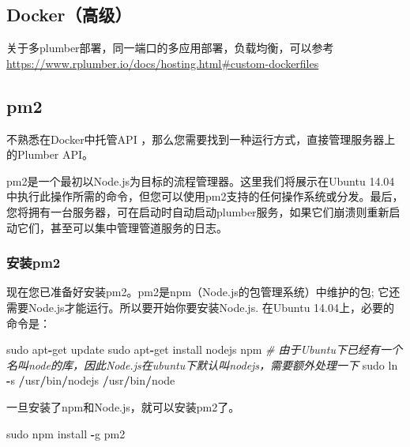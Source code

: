 \documentclass[]{book}
\newenvironment{Shaded}{\begin{snugshade}}{\end{snugshade}}
\newcommand{\CommentTok}[1]{\textcolor[rgb]{0.56,0.35,0.01}{\textit{#1}}}
\newcommand{\OperatorTok}[1]{\textcolor[rgb]{0.81,0.36,0.00}{\textbf{#1}}}
\newcommand{\NormalTok}[1]{#1}
\begin{document}
\subsection{Docker（高级）}\label{docker}

关于多plumber部署，同一端口的多应用部署，负载均衡，可以参考\url{https://www.rplumber.io/docs/hosting.html\#custom-dockerfiles}

\subsection{pm2}\label{pm2}

不熟悉在Docker中托管API
，那么您需要找到一种运行方式，直接管理服务器上的Plumber API。

pm2是一个最初以Node.js为目标的流程管理器。这里我们将展示在Ubuntu
14.04中执行此操作所需的命令，但您可以使用pm2支持的任何操作系统或分发。最后，您将拥有一台服务器，可在启动时自动启动plumber服务，如果它们崩溃则重新启动它们，甚至可以集中管理管道服务的日志。

\subsubsection{安装pm2}\label{pm2}

现在您已准备好安装pm2。pm2是npm（Node.js的包管理系统）中维护的包;
它还需要Node.js才能运行。所以要开始你要安装Node.js. 在Ubuntu
14.04上，必要的命令是：

\begin{Shaded}
\begin{Highlighting}[]
\NormalTok{sudo apt}\OperatorTok{-}\NormalTok{get update}
\NormalTok{sudo apt}\OperatorTok{-}\NormalTok{get install nodejs npm}
\CommentTok{# 由于Ubuntu下已经有一个名叫node的库，因此Node.js在ubuntu下默认叫nodejs，需要额外处理一下}
\NormalTok{sudo ln }\OperatorTok{-}\NormalTok{s }\OperatorTok{/}\NormalTok{usr}\OperatorTok{/}\NormalTok{bin}\OperatorTok{/}\NormalTok{nodejs }\OperatorTok{/}\NormalTok{usr}\OperatorTok{/}\NormalTok{bin}\OperatorTok{/}\NormalTok{node}
\end{Highlighting}
\end{Shaded}

一旦安装了npm和Node.js，就可以安装pm2了。

\begin{Shaded}
\begin{Highlighting}[]
\NormalTok{sudo npm install }\OperatorTok{-}\NormalTok{g pm2}
\end{Highlighting}
\end{Shaded}
\end{document}
